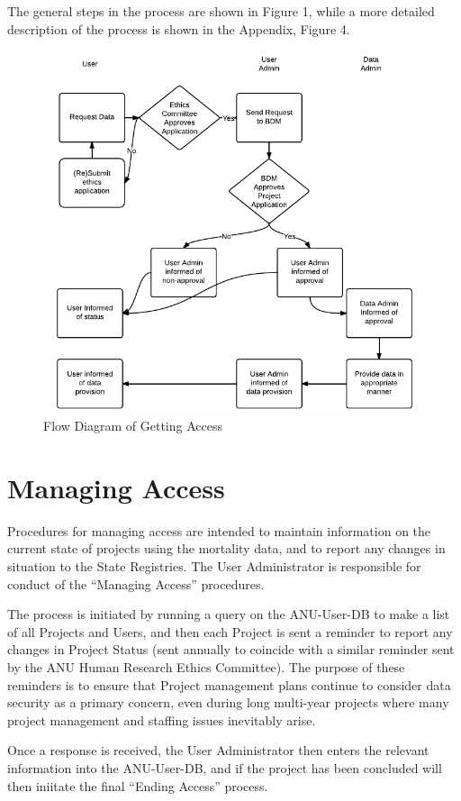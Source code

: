 \documentclass[a4paper]{article}
\begin{document}
The general steps in the process are shown in Figure 1, while a more detailed description of the process is shown in the Appendix, Figure 4.

\begin{figure}[!h]
\centering
\includegraphics[width=.8\textwidth]{DataAccessFlowDiagram-GettingAccess-general.png}
\caption{Flow Diagram of Getting Access}
\label{fig:DataAccessFlowDiagram-GettingAccess}
\end{figure}
\clearpage
\section{Managing Access}
\label{sec-3}

Procedures for managing access are intended to maintain information on the current state of projects using the mortality data, and to report any changes in situation to the State Registries. The User Administrator is responsible for conduct of the ``Managing Access'' procedures.

The process is initiated by running a query on the ANU-User-DB to make a list of all Projects and Users, and then each Project is sent a reminder to report any changes in Project Status (sent annually to coincide with a similar reminder sent by the ANU Human Research Ethics Committee). The purpose of these reminders is to ensure that Project management plans continue to consider data security as a primary concern, even during long multi-year projects where many project management and staffing issues inevitably arise.

Once a response is received, the User Administrator then enters the relevant information into the ANU-User-DB, and if the project has been concluded will then iniitate the final ``Ending Access'' process.
\end{document}
